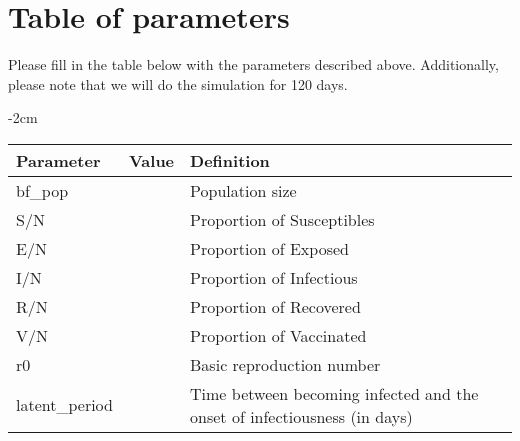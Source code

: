 \documentclass{article}
\begin{document}
\section{Table of parameters}
Please fill in the table below with the parameters described above.
Additionally, please note that we will do the simulation for 120 days.
\begin{table}[htb]
	\centering
	\addtolength{\leftskip} {-2cm}
	\addtolength{\rightskip}{-2cm}
	\begin{tabular}{@{}lll@{}}
		\toprule
		Parameter            & Value              & Definition                                                                            \\ \midrule
		bf\_pop              & \underline{\hspace{1cm}} & Population size                                                                       \\
		S/N                    & \underline{\hspace{1cm}}  & Proportion of Susceptibles                                                            \\
		E/N                    &  \underline{\hspace{1cm}} & Proportion of Exposed                                                                 \\
		I/N                    & \underline{\hspace{1cm}} & Proportion of Infectious                                                              \\
		R/N                    & \underline{\hspace{1cm}} & Proportion of Recovered                                                               \\
		V/N                    & \underline{\hspace{1cm}} & Proportion of Vaccinated                                                              \\
		r0                   & \underline{\hspace{1cm}} & Basic reproduction number                                                             \\
		latent\_period       & \underline{\hspace{1cm}} & Time between becoming infected and the onset of infectiousness (in days)             \\

\end{tabular}
\end{table}
\end{document}
